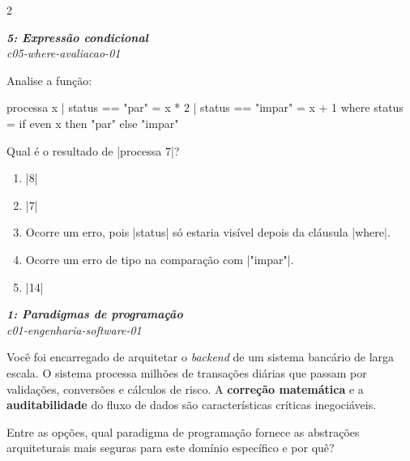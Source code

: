 \documentclass[a4paper,10pt,brazil]{article}
\begin{document}
\begin{multicols}{2}
\begin{enumerate}
\end{enumerate}

\begin{flushright}
  \footnotesize
  \textit{\textbf{5: Expressão condicional}}\\
  \textit{c05-where-avaliacao-01}\\

\end{flushright}
Analise a função:
\begin{haskellcode}
processa x
  | status == "par"   = x * 2
  | status == "impar" = x + 1
  where
    status = if even x then "par" else "impar"
\end{haskellcode}
Qual é o resultado de \haskellinline|processa 7|?

\begin{enumerate}
  \item \haskellinline|8|

  \item \haskellinline|7|

  \item Ocorre um erro, pois \haskellinline|status| só estaria visível depois da cláusula \haskellinline|where|.

  \item Ocorre um erro de tipo na comparação com \haskellinline|"impar"|.

  \item \haskellinline|14|


\end{enumerate}

\begin{flushright}
  \footnotesize
  \textit{\textbf{1: Paradigmas de programação}}\\
  \textit{c01-engenharia-software-01}\\

\end{flushright}
Você foi encarregado de arquitetar o \emph{backend} de um sistema bancário de larga escala. O sistema processa milhões de transações diárias que passam por validações, conversões e cálculos de risco. A \textbf{correção matemática} e a \textbf{auditabilidade} do fluxo de dados são características críticas inegociáveis.

Entre as opções, qual paradigma de programação fornece as abstrações arquiteturais mais seguras para este domínio específico e por quê?


\end{multicols}
\end{document}
